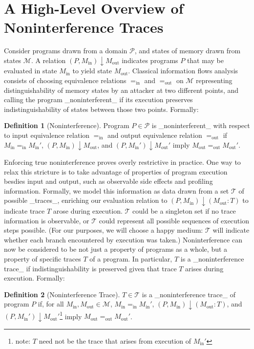 \documentclass{article}
\renewcommand{\P}{\ensuremath{\mathcal{P}}\xspace}
\newcommand{\M}{\ensuremath{\mathcal{M}}\xspace}
\renewcommand{\T}{\ensuremath{\mathcal{T}}\xspace}
\renewcommand{\eval}[3]{\ensuremath{(#1, #2) \downarrow #3}}
\newcommand{\evalT}[4]{\ensuremath{(#1, #2) \downarrow (#3 : #4)}}
\renewcommand{\sin}{_{\text{in}}}
\newcommand{\sout}{_{\text{out}}}
\newcommand{\eqin}{\ensuremath{=\sin}\xspace}
\newcommand{\eqout}{\ensuremath{=\sout}\xspace}
\newcommand{\Min}{\ensuremath{M\sin}\xspace}
\newcommand{\Mout}{\ensuremath{M\sout}\xspace}
\theoremstyle{definition}
\newtheorem{definition}{Definition}
\begin{document}
\section*{A High-Level Overview of Noninterference Traces}

Consider programs drawn from a domain \P, and states of memory drawn from states \M. A relation \eval{P}{\Min}{\Mout} indicates programs $P$ that may be evaluated in state \Min to yield state \Mout. Classical information flows analysis consists of choosing equivalence relations \eqin and \eqout on \M representing distinguishability of memory states by an attacker at two different points, and calling the program _noninterferent_ if its execution preserves indistinguishability of states between those two points. Formally: 

\begin{definition}[Noninterference]
  Program $P \in \P$ is _noninterferent_ with respect to input equivalence relation \eqin and output equivalence relation \eqout if $\Min \eqin \Min'$, $\eval{P}{\Min}{\Mout}$, and $\eval{P}{\Min'}{\Mout'}$ imply $\Mout \eqout \Mout'$.
\end{definition}

Enforcing true noninterference proves overly restrictive in practice. One way to relax this stricture is to take advantage of properties of program execution besdies input and output, such as observable side effects and profiling information. Formally, we model this information as data drawn from a set \T of possible _traces_, enriching our evaluation relation to \evalT{P}{\Min}{\Mout}{T} to indicate trace $T$ arose during execution. \T could be a singleton set if no trace information is observable, or \T could represent all possible sequences of execution steps possible. (For our purposes, we will choose a happy medium: \T will indicate whether each branch encountered by execution was taken.) Noninterference can now be considered to be not just a property of programs as a whole, but a property of specific traces $T$ of a program. In particular, $T$ is a _noninterference trace_ if indistinguishability is preserved given that trace $T$ arises during execution. Formally:

\begin{definition}[Noninterference Trace]
  $T \in \T$ is a _noninterference trace_ of program $P$ if, for all $\Min, \Mout \in \M$, $\Min \eqin \Min'$, $\evalT{P}{\Min}{\Mout}{T}$, and $\eval{P}{\Min'}{\Mout'}$\footnote{note: $T$ need not be the trace that arises from execution of $\Min'$} imply $\Mout \eqout \Mout'$.
\end{definition}
\end{document}
